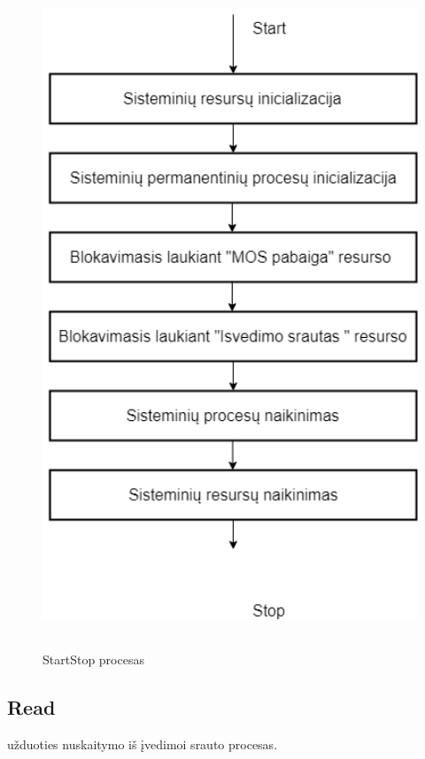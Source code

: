 \documentclass[oneside]{VUMIFPSkursinis}
\begin{document}
\begin{figure}[H]
		\centering	
	\includegraphics[width=18cm,height=20cm,keepaspectratio]{StartStop.png}
	\caption{StartStop procesas}
	\label{fig:StartStop procesas}
\end{figure}

\subsection{Read} užduoties nuskaitymo iš įvedimoi srauto procesas.
\end{document}
